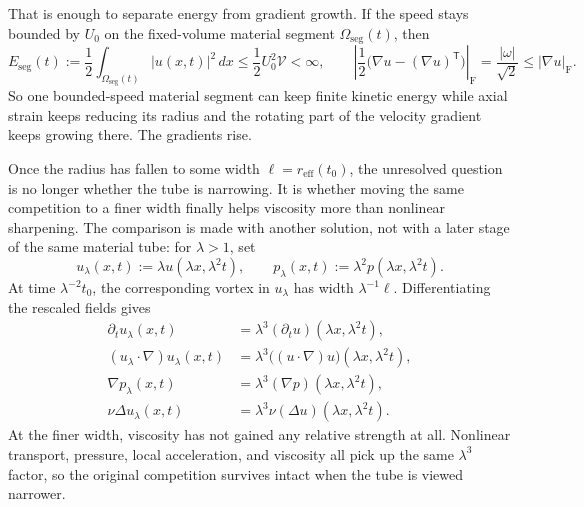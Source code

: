 That is enough to separate energy from gradient growth. If the speed stays bounded by \(U_0\) on the fixed-volume material segment \(\Omega_{\mathrm{seg}}(t)\), then
\[
  E_{\mathrm{seg}}(t)
  :=
  \frac12\int_{\Omega_{\mathrm{seg}}(t)}|u(x,t)|^2\,dx
  \leq
  \frac12U_0^2\mathcal V
  <
  \infty,
  \qquad
  \left|\frac12\bigl(\nabla u-(\nabla u)^{\mathsf T}\bigr)\right|_{\mathrm F}
  =
  \frac{|\omega|}{\sqrt2}
  \leq
  |\nabla u|_{\mathrm F}.
\]
So one bounded-speed material segment can keep finite kinetic energy while axial strain keeps reducing its radius and the rotating part of the velocity gradient keeps growing there. The gradients rise.


Once the radius has fallen to some width \(\ell=r_{\mathrm{eff}}(t_0)\), the unresolved question is no longer whether the tube is narrowing. It is whether moving the same competition to a finer width finally helps viscosity more than nonlinear sharpening. The comparison is made with another solution, not with a later stage of the same material tube: for \(\lambda>1\), set
\[
  u_\lambda(x,t)
  :=
  \lambda u(\lambda x,\lambda^2t),
  \qquad
  p_\lambda(x,t)
  :=
  \lambda^2p(\lambda x,\lambda^2t).
\]
At time \(\lambda^{-2}t_0\), the corresponding vortex in \(u_\lambda\) has width \(\lambda^{-1}\ell\). Differentiating the rescaled fields gives
\[
\begin{aligned}
  \partial_tu_\lambda(x,t)
  &=
  \lambda^3(\partial_tu)(\lambda x,\lambda^2t),
  \\
  (u_\lambda\cdot\nabla)u_\lambda(x,t)
  &=
  \lambda^3\bigl((u\cdot\nabla)u\bigr)(\lambda x,\lambda^2t),
  \\
  \nabla p_\lambda(x,t)
  &=
  \lambda^3(\nabla p)(\lambda x,\lambda^2t),
  \\
  \nu\Delta u_\lambda(x,t)
  &=
  \lambda^3\nu(\Delta u)(\lambda x,\lambda^2t).
\end{aligned}
\]
At the finer width, viscosity has not gained any relative strength at all. Nonlinear transport, pressure, local acceleration, and viscosity all pick up the same \(\lambda^3\) factor, so the original competition survives intact when the tube is viewed narrower.


